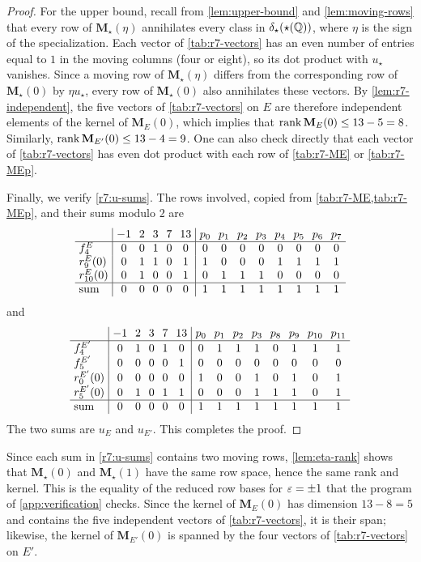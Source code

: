 \begin{proof}
For the upper bound, recall from \cref{lem:upper-bound} and
\cref{lem:moving-rows} that every row of $\mathbf M_\star(\eta)$ annihilates
every class in $\delta_\star(\star(\mathbb Q))$, where $\eta$ is the sign of the
specialization. Each vector of \cref{tab:r7-vectors} has an even number of
entries equal to $1$ in the moving columns (four or eight), so its dot product
with $u_\star$ vanishes. Since a moving row of $\mathbf M_\star(\eta)$ differs
from the corresponding row of $\mathbf M_\star(0)$ by $\eta u_\star$, every row
of $\mathbf M_\star(0)$ also annihilates these vectors. By
\cref{lem:r7-independent}, the five vectors of \cref{tab:r7-vectors} on $E$
are therefore independent elements of the kernel of $\mathbf M_E(0)$, which
implies that
$\operatorname{rank}\mathbf M_E(0)\le13-5=8$. Similarly, $\operatorname{rank}\mathbf M_{E'}(0)\le13-4=9$. One can also check directly that each
vector of \cref{tab:r7-vectors} has even dot product with each row of
\cref{tab:r7-ME} or \cref{tab:r7-MEp}.

Finally, we verify \eqref{r7:u-sums}. The rows involved, copied from
\cref{tab:r7-ME,tab:r7-MEp}, and their sums modulo $2$ are
\[
\setlength{\arraycolsep}{3.5pt}
\begin{array}{l|ccccc|cccccccc}
 & -1 & 2 & 3 & 7 & 13 & p_0 & p_1 & p_2 & p_3 & p_4 & p_5 & p_6 & p_7\\\hline
 f^E_4 & 0&0&1&0&0 & 0&0&0&0&0&0&0&0\\
 r^{E}_9(0) & 0&1&1&0&1 & 1&0&0&0&1&1&1&1\\
 r^{E}_{10}(0) & 0&1&0&0&1 & 0&1&1&1&0&0&0&0\\\hline
 \text{sum} & 0&0&0&0&0 & 1&1&1&1&1&1&1&1
\end{array}
\]
and
\[
\setlength{\arraycolsep}{3.5pt}
\begin{array}{l|ccccc|cccccccc}
 & -1 & 2 & 3 & 7 & 13 & p_0 & p_1 & p_2 & p_3 & p_8 & p_9 & p_{10} & p_{11}\\\hline
 f^{E'}_4 & 0&1&0&1&0 & 0&1&1&1&0&1&1&1\\
 f^{E'}_5 & 0&0&0&0&1 & 0&0&0&0&0&0&0&0\\
 r^{E'}_0(0) & 0&0&0&0&0 & 1&0&0&1&0&1&0&1\\
 r^{E'}_5(0) & 0&1&0&1&1 & 0&0&0&1&1&1&0&1\\\hline
 \text{sum} & 0&0&0&0&0 & 1&1&1&1&1&1&1&1
\end{array}
\]
The two sums are $u_E$ and $u_{E'}$. This completes the proof.
\end{proof}

Since each sum in \eqref{r7:u-sums} contains two moving rows,
\cref{lem:eta-rank} shows that $\mathbf M_\star(0)$ and $\mathbf M_\star(1)$
have the same row space, hence the same rank and kernel. This is the
equality of the reduced row bases for $\varepsilon=\pm1$ that the program of
\cref{app:verification} checks. Since the kernel of $\mathbf M_E(0)$
has dimension $13-8=5$ and contains the five independent vectors of
\cref{tab:r7-vectors}, it is their span; likewise, the kernel of
$\mathbf M_{E'}(0)$ is spanned by the four vectors of \cref{tab:r7-vectors}
on $E'$.

